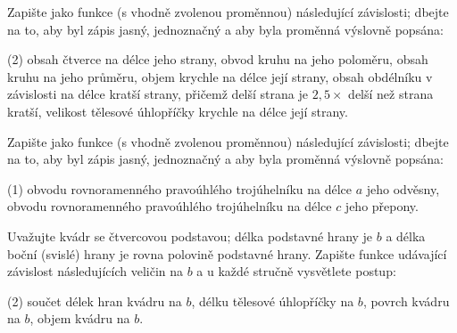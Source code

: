 \documentclass[12pt,a4paper]{article}
\begin{document}

\exercisepart
\setcounter{section}{1}


\begin{exercise}
    Zapište jako funkce (s vhodně zvolenou proměnnou) následující závislosti; dbejte na to, aby byl zápis jasný, jednoznačný a aby byla proměnná výslovně popsána:
    \begin{tasks}(2)
        \task obsah čtverce na délce jeho strany,
        \task obvod kruhu na jeho poloměru,
        \task obsah kruhu na jeho průměru,
        \task objem krychle na délce její strany,
        \task obsah obdélníku v závislosti na délce kratší strany, přičemž delší strana je \(2{,}5\!\times\) delší než strana kratší,
        \task velikost tělesové úhlopříčky krychle na délce její strany.
    \end{tasks}
\end{exercise}


\begin{exercise}
    Zapište jako funkce (s vhodně zvolenou proměnnou) následující závislosti; dbejte na to, aby byl zápis jasný, jednoznačný a aby byla proměnná výslovně popsána:
    \begin{tasks}(1)
        \task obvodu rovnoramenného pravoúhlého trojúhelníku na délce $a$ jeho odvěsny, 
        \task obvodu rovnoramenného pravoúhlého trojúhelníku na délce $c$ jeho přepony.
    \end{tasks}
\end{exercise}


\begin{exercise}
    Uvažujte kvádr se čtvercovou podstavou; délka podstavné hrany je \(b\) a délka boční (svislé) hrany je rovna polovině podstavné hrany. Zapište funkce udávající závislost následujících veličin na \(b\) a u každé stručně vysvětlete postup:
    \begin{tasks}(2)
        \task součet délek hran kvádru na \(b\),
        \task délku tělesové úhlopříčky na \(b\),
        \task povrch kvádru na \(b\),
        \task objem kvádru na \(b\).
    \end{tasks}
\end{exercise}
\end{document}
